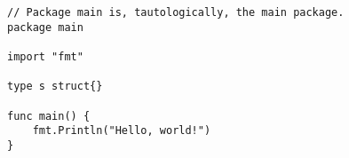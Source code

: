 \documentclass{article}
\begin{document}
\begin{lstlisting}
// Package main is, tautologically, the main package.
package main

import "fmt"

type s struct{}

func main() {
	fmt.Println("Hello, world!")
}
\end{lstlisting}
\end{document}
